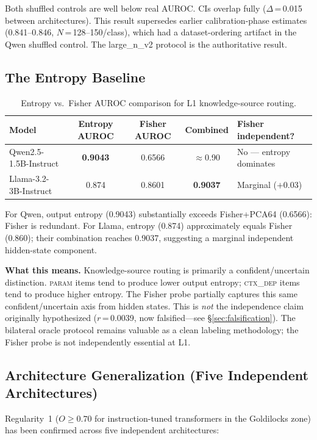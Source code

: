 \documentclass[11pt]{article}
\begin{document}
Both shuffled controls are well below real AUROC. CIs overlap fully
($\Delta$\,=\,0.015 between architectures). This result supersedes earlier
calibration-phase estimates (0.841--0.846, $N$\,=\,128--150/class), which had a
dataset-ordering artifact in the Qwen shuffled control. The large\_n\_v2 protocol is the
authoritative result.

\subsection{The Entropy Baseline}

\begin{table}[h!]
\centering
\caption{Entropy vs.\ Fisher AUROC comparison for L1 knowledge-source routing.}
\begin{tabular}{lcccl}
\toprule
Model & Entropy AUROC & Fisher AUROC & Combined & Fisher independent? \\
\midrule
Qwen2.5-1.5B-Instruct & \textbf{0.9043} & 0.6566 & $\approx$0.90 & No --- entropy dominates \\
Llama-3.2-3B-Instruct & 0.874 & 0.8601 & \textbf{0.9037} & Marginal ($+$0.03) \\
\bottomrule
\end{tabular}
\end{table}

For Qwen, output entropy (0.9043) substantially exceeds Fisher+PCA64 (0.6566): Fisher
is redundant. For Llama, entropy (0.874) approximately equals Fisher (0.860); their
combination reaches 0.9037, suggesting a marginal independent hidden-state component.

\textbf{What this means.} Knowledge-source routing is primarily a confident/uncertain
distinction. \textsc{param} items tend to produce lower output entropy; \textsc{ctx\_dep}
items tend to produce higher entropy. The Fisher probe partially captures this same
confident/uncertain axis from hidden states. This is \emph{not} the independence claim
originally hypothesized ($r$\,=\,0.0039, now falsified---see \S\ref{sec:falsification}).
The bilateral oracle protocol remains valuable as a clean labeling methodology; the
Fisher probe is not independently essential at L1.

\subsection{Architecture Generalization (Five Independent Architectures)}
\label{sec:l1_arch}

Regularity~1 ($O \geq 0.70$ for instruction-tuned transformers in the Goldilocks zone) has been
confirmed across five independent architectures:
\end{document}
